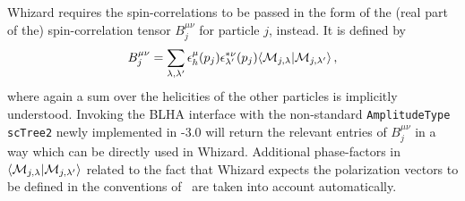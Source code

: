 Whizard requires the spin-correlations to be passed in the form of the (real  part of the) spin-correlation tensor $B_j^{\mu\nu}$ for particle $j$, instead. It is defined by
\begin{equation}
   B_j^{\mu\nu} = \sum_{\lambda,\lambda'}\epsilon_h^\mu(p_j)\epsilon_{\lambda'}^{*\nu}(p_j)\langle {\cal M}_{j,\lambda}|{\cal M}_{j,\lambda'}\rangle\,,
\end{equation}
where again a sum over the helicities of the other particles is implicitly understood. Invoking the BLHA interface with the non-standard \texttt{AmplitudeType scTree2} newly implemented in \gosam{}-3.0 will return the relevant entries of $B_j^{\mu\nu}$ in a way which can be directly used in Whizard. Additional phase-factors in $\langle {\cal M}_{j,\lambda}|{\cal M}_{j,\lambda'}\rangle$ related to the fact that Whizard expects the polarization vectors to be defined in the conventions of~\cite{Murayama:1992gi} are taken into account automatically.
